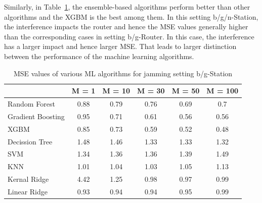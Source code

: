 Similarly, in Table~\ref{tab:T3}, the ensemble-based algorithms perform better than other algorithms and the XGBM is the best among them. In this setting b/g/n-Station, the interference impacts the router and hence the MSE values generally higher than the corresponding cases in setting b/g-Router. In this case, the interference has a larger impact and hence larger MSE. That leads to larger distinction between the performance of the machine learning algorithms. 
\begin{table}[htbp]
  \centering
  \caption{MSE values of various ML algorithms for jamming setting b/g-Station}
    \begin{tabular}{|p{5.3em}|c|c|c|c|c|}
    \toprule
          & \multicolumn{1}{p{3.4em}|}{M = 1} & \multicolumn{1}{p{3.9em}|}{M = 10} & \multicolumn{1}{p{3.9em}|}{M = 30} & \multicolumn{1}{p{3.9em}|}{M = 50} & \multicolumn{1}{p{4.4em}|}{M = 100} \\
    \midrule
    Random Forest	 & 0.88  & 0.79  & 0.76  & 0.69  & 0.7 \\
    \midrule
    Gradient Boosting  & 0.95  & 0.71  & 0.61  & 0.56  & 0.56 \\
    \midrule
    XGBM  & 0.85  & 0.73  & 0.59  & 0.52  & 0.48 \\
    \midrule
    Decission Tree & 1.48  & 1.46  & 1.33  & 1.33  & 1.32 \\
    \midrule
    SVM   & 1.34  & 1.36  & 1.36  & 1.39  & 1.49 \\
    \midrule
    KNN   & 1.01  & 1.04  & 1.03  & 1.05  & 1.13 \\
    \midrule
    Kernal Ridge & 4.42  & 1.25  & 0.98  & 0.97  & 0.99 \\
    \midrule
    Linear Ridge & 0.93  & 0.94  & 0.94  & 0.95  & 0.99 \\
    \bottomrule
    \end{tabular}%
  \label{tab:T3}%
\end{table}%

